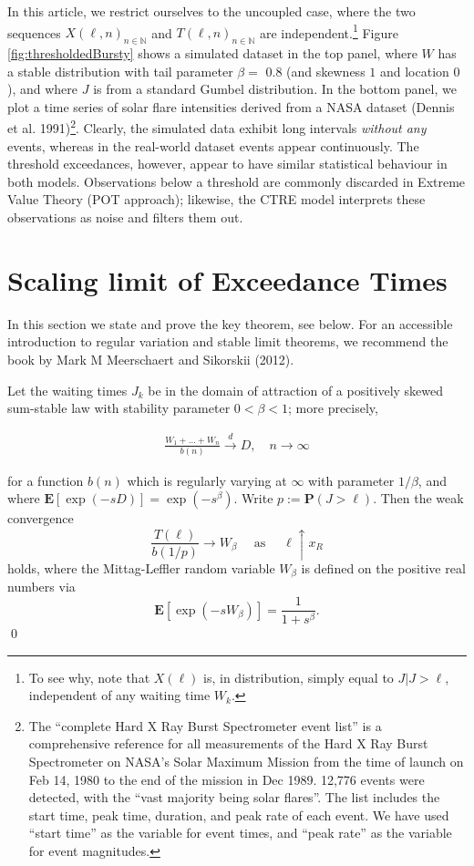\documentclass[smallextended]{svjour3}       %
\providecommand{\tightlist}{%
  \setlength{\itemsep}{0pt}\setlength{\parskip}{0pt}}
\begin{document}
In this article, we restrict ourselves to the uncoupled case, where the
two sequences \(X(\ell, n)_{n \in \mathbb N}\) and
\(T(\ell, n)_{n \in \mathbb N}\) are independent.\footnote{To see why,
  note that \(X(\ell)\) is, in distribution, simply equal to
  \(J | J > \ell\), independent of any waiting time \(W_k\).} Figure
\ref{fig:thresholdedBursty} shows a simulated dataset in the top panel,
where \(W\) has a stable distribution with tail parameter \(\beta =\)
0.8 (and skewness \(1\) and location \(0\)), and where \(J\) is from a
standard Gumbel distribution. In the bottom panel, we plot a time series
of solar flare intensities derived from a NASA dataset (Dennis et al.
1991)\footnote{The ``complete Hard X Ray Burst Spectrometer event list''
  is a comprehensive reference for all measurements of the Hard X Ray
  Burst Spectrometer on NASA's Solar Maximum Mission from the time of
  launch on Feb 14, 1980 to the end of the mission in Dec 1989. 12,776
  events were detected, with the ``vast majority being solar flares''.
  The list includes the start time, peak time, duration, and peak rate
  of each event. We have used ``start time'' as the variable for event
  times, and ``peak rate'' as the variable for event magnitudes.}.
Clearly, the simulated data exhibit long intervals \emph{without any}
events, whereas in the real-world dataset events appear continuously.
The threshold exceedances, however, appear to have similar statistical
behaviour in both models. Observations below a threshold are commonly
discarded in Extreme Value Theory (POT approach); likewise, the CTRE
model interprets these observations as noise and filters them out.

\section{Scaling limit of Exceedance Times}\label{sec:scaling}

In this section we state and prove the key theorem, see below. For an
accessible introduction to regular variation and stable limit theorems,
we recommend the book by Mark M Meerschaert and Sikorskii (2012).

\begin{description}
\tightlist
\item[\textbf{Theorem:}]
Let the waiting times \(J_k\) be in the domain of attraction of a
positively skewed sum-stable law with stability parameter
\(0 < \beta < 1\); more precisely,

\begin{align} \label{eq:stability}
\frac{W_1 + \ldots + W_n}{b(n)} \overset{d}{\longrightarrow} D, 
\quad n \to \infty
\end{align}

for a function \(b(n)\) which is regularly varying at \(\infty\) with
parameter \(1/\beta\), and where
\(\mathbf E[\exp(-sD)] = \exp(-s^\beta)\). Write
\(p := \mathbf P(J > \ell)\). Then the weak convergence \[
\frac{T(\ell)} {b(1/p)} \to W_\beta \quad \text{ as } \quad \ell \uparrow x_R
\] holds, where the Mittag-Leffler random variable \(W_\beta\) is
defined on the positive real numbers via \[
\mathbf E[\exp(-sW_\beta)] = \frac{1}{1+s^\beta}.
\] \qed
\end{description}
\end{document}
